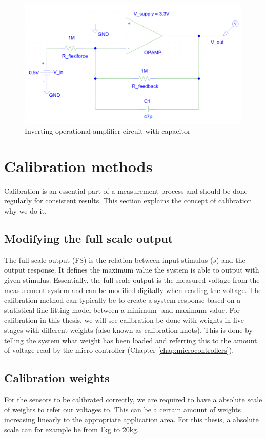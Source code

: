 \begin{figure}
    \centering
    \includegraphics[scale=0.28]{figures/capacitor.png}
    \caption{Inverting operational amplifier circuit with capacitor}
    \label{fig:capacitor}
\end{figure}


\section{Calibration methods}
Calibration is an essential part of a measurement process and should be done regularly for consistent results. This section explains the concept of calibration why we do it.

\subsection{Modifying the full scale output}
The full scale output (FS) is the relation between input stimulus ($s$) and the output response. It defines the maximum value the system is able to output with given stimulus. Essentially, the full scale output is the measured voltage from the measurement system and can be modified digitally when reading the voltage.
The calibration method can typically be to create a system response based on a statistical line fitting model between a minimum- and maximum-value. For calibration in this thesis, we will see calibration be done with weights in five stages with different weights (also known as calibration knots). This is done by telling the system what weight has been loaded and referring this to the amount of voltage read by the micro controller (Chapter \ref{chap:microcontrollers}).

\subsection{Calibration weights}
For the sensors to be calibrated correctly, we are required to have a absolute scale of weights to refer our voltages to. This can be a certain amount of weights increasing linearly to the appropriate application area. For this thesis, a absolute scale can for example be from 1\si{\kilogram} to 20\si{\kilogram}. 


